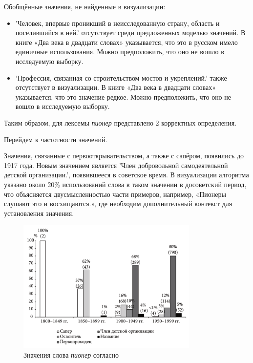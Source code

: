 Обобщённые значения, не найденные в визуализации:
\begin{itemize}
    \item ’Человек, впервые проникший в неисследованную страну, область и поселившийся в ней.’
отсутствует среди предложенных моделью значений.
В книге «Два века в двадцати словах» указывается, что это в русском имело единичные использования.
Можно предположить, что оно не вошло в исследуемую выборку.

    \item ’Профессия, связанная со строительством мостов и укреплений.’ также отсутствует в визуализации.
В книге «Два века в двадцати словах» указывается, что это значение редкое.
Можно предположить, что оно не вошло в исследуемую выборку.
\end{itemize}

Таким образом, для лексемы \textit{пионер} представлено 2 корректных определения.

Перейдем к частотности значений.

Значения, связанные с первооткрывательством, а также с сапёром, появились до 1917 года.
Новым значением является ’Член добровольной самодеятельной детской организации.’,
появившееся в советское время.
В визуализации алгоритма указано около 20\% использований слова в таком значении
в досоветский период, что объясняется двусмысленностью части примеров,
например, «Пионеры слушают это и восхищаются.», где необходим дополнительный контекст
для установления значения.

\begin{figure}[H]
    \centering %
    \includegraphics[width=0.8\textwidth]{img/book/pioner/all}
    \caption{Значения слова \textit{пионер} согласно~\cite{TwoCenturies}}
\end{figure}

